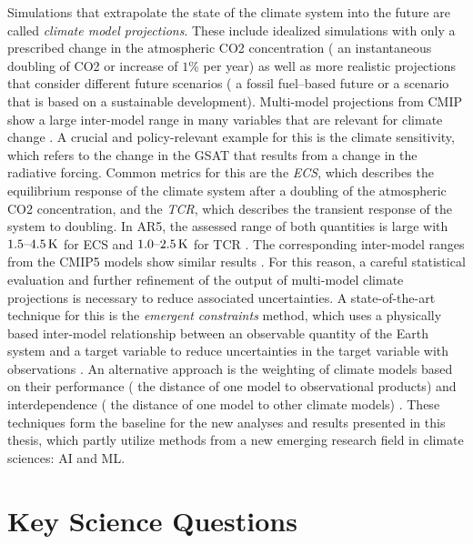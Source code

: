 Simulations that extrapolate the state of the climate system into the future
are called \emph{climate model projections}. These include idealized
simulations with only a prescribed change in the atmospheric \ac{CO2}
concentration (\eg{} an instantaneous doubling of \ac{CO2} or 
increase of $1 \unit{\%}$ per year) as well as more realistic projections that
consider different future scenarios (\eg{} a fossil fuel--based future or a
scenario that is based on a sustainable development). Multi-model projections
from \ac{CMIP} show a large inter-model range in many variables that are
relevant for climate change \autocite{Collins2013, Flato2013}. A crucial and
policy-relevant example for this is the climate sensitivity, which refers to
the change in the \ac{GSAT} that results from a change in the radiative
forcing. Common metrics for this are the \emph{\ac{ECS}}, which describes the
equilibrium response of the climate system after a doubling of the atmospheric
\ac{CO2} concentration, and the \emph{\ac{TCR}}, which describes the transient
response of the system to  doubling. In \acs{AR}5, the assessed range
of both quantities is large with $\rangeunit{1.5}{4.5}{K}$ for \ac{ECS} and
$\rangeunit{1.0}{2.5}{K}$ for \ac{TCR} \autocite{Stocker2013}. The
corresponding inter-model ranges from the \acs{CMIP}5 models show similar
results \autocite{Flato2013}. For this reason, a careful statistical evaluation
and further refinement of the output of multi-model climate projections is
necessary to reduce associated uncertainties. A state-of-the-art technique for
this is the \emph{emergent constraints} method, which uses a physically based
inter-model relationship between an observable quantity of the Earth system and
a target variable to reduce uncertainties in the target variable with
observations \autocite{Allen2002}. An alternative approach is the weighting of
climate models based on their performance (\ie{} the distance of one model to
observational products) and interdependence (\ie{} the distance of one model to
other climate models) \autocite{Knutti2017a}. These techniques form the
baseline for the new analyses and results presented in this thesis, which
partly utilize methods from a new emerging research field in climate sciences:
\ac{AI} and \ac{ML}.


\section{Key Science Questions}
\label{sec:01:key_science_questions}

